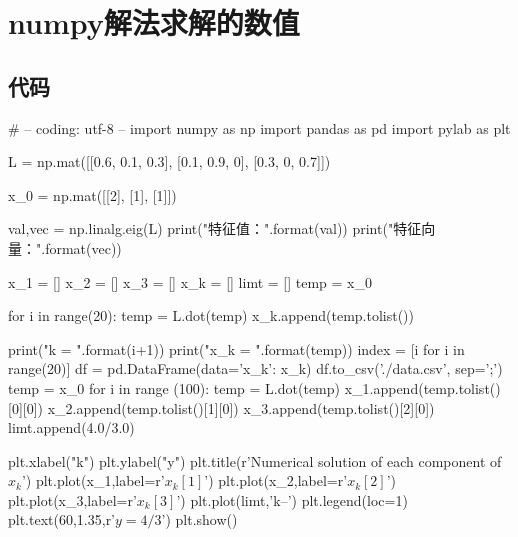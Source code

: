 \section{numpy解法求解的数值}
\subsection{代码}
\begin{python}
# -- coding: utf-8 --
import numpy as np
import pandas as pd
import pylab as plt

L = np.mat([[0.6, 0.1, 0.3],
           [0.1, 0.9, 0],
           [0.3, 0, 0.7]])

x_0 = np.mat([[2], [1], [1]])

val,vec = np.linalg.eig(L)
print("特征值：{}".format(val))
print("特征向量：{}".format(vec))

x_1 = []
x_2 = []
x_3 = []
x_k = []
limt = []
temp = x_0

for i in range(20):
    temp = L.dot(temp)
    x_k.append(temp.tolist())

    print("k = {}".format(i+1))
    print("x_k = {}".format(temp))
index = [i for i in range(20)]
df = pd.DataFrame(data={'x_k': x_k})
df.to_csv('./data.csv', sep=';')
temp = x_0
for i in range (100):
    temp = L.dot(temp)
    x_1.append(temp.tolist()[0][0])
    x_2.append(temp.tolist()[1][0])
    x_3.append(temp.tolist()[2][0])
    limt.append(4.0/3.0)

plt.xlabel("k")
plt.ylabel("y")
plt.title(r'Numerical solution of each component of $x_k$')
plt.plot(x_1,label=r'$x_k[1]$')
plt.plot(x_2,label=r'$x_k[2]$')
plt.plot(x_3,label=r'$x_k[3]$')
plt.plot(limt,'k--')
plt.legend(loc=1)
plt.text(60,1.35,r'$y = 4/3$')
plt.show()
\end{python}
